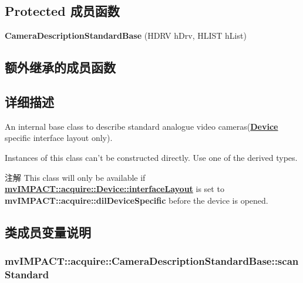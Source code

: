 \subsection*{Protected 成员函数}
\begin{DoxyCompactItemize}
\item 
\hypertarget{classmv_i_m_p_a_c_t_1_1acquire_1_1_camera_description_standard_base_afdac5e8f16d0f5511d535292893eed0b}{{\bfseries Camera\+Description\+Standard\+Base} (H\+D\+R\+V h\+Drv, H\+L\+I\+S\+T h\+List)}\label{classmv_i_m_p_a_c_t_1_1acquire_1_1_camera_description_standard_base_afdac5e8f16d0f5511d535292893eed0b}

\end{DoxyCompactItemize}
\subsection*{额外继承的成员函数}


\subsection{详细描述}
An internal base class to describe standard analogue video cameras({\bfseries \hyperlink{classmv_i_m_p_a_c_t_1_1acquire_1_1_device}{Device}} specific interface layout only). 

Instances of this class can't be constructed directly. Use one of the derived types.

\begin{DoxyNote}{注解}
This class will only be available if {\bfseries \hyperlink{classmv_i_m_p_a_c_t_1_1acquire_1_1_device_ab4dd0ecc9d456bb5ddc01d844c9d6f2d}{mv\+I\+M\+P\+A\+C\+T\+::acquire\+::\+Device\+::interface\+Layout}} is set to {\bfseries mv\+I\+M\+P\+A\+C\+T\+::acquire\+::dil\+Device\+Specific} before the device is opened. 
\end{DoxyNote}


\subsection{类成员变量说明}
\hypertarget{classmv_i_m_p_a_c_t_1_1acquire_1_1_camera_description_standard_base_a818090d21bb246d02c4db4474dcc32d8}{
\subsubsection[{scan\+Standard}]{ mv\+I\+M\+P\+A\+C\+T\+::acquire\+::\+Camera\+Description\+Standard\+Base\+::scan\+Standard}}\label{classmv_i_m_p_a_c_t_1_1acquire_1_1_camera_description_standard_base_a818090d21bb246d02c4db4474dcc32d8}


